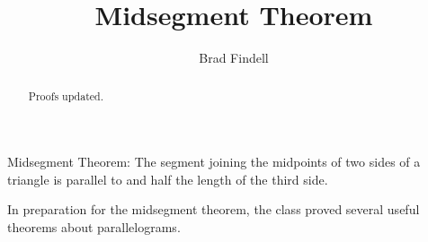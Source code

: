 \documentclass[nooutcomes]{ximera}
\title{Midsegment Theorem}
\author{Brad Findell}
\begin{document}
\begin{abstract}
Proofs updated. 
\end{abstract}
\maketitle


\begin{theorem}
Midsegment Theorem: The segment joining the midpoints of two sides of a triangle is parallel to and half the length of the third side.
\end{theorem}


In preparation for the midsegment theorem, the class proved several useful theorems about parallelograms. 

\end{document}
